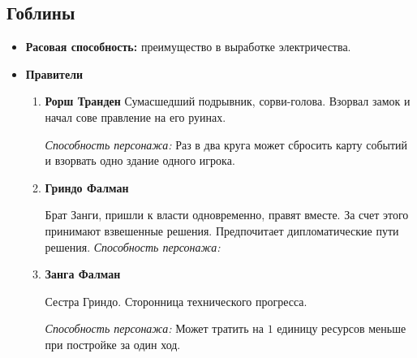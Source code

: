 \documentclass[a4paper,12pt,landscape]{article}
\begin{document}
    \subsection{Гоблины}
    \begin{itemize}
      \item \textbf{Расовая способность:} преимущество в выработке электричества.
      \item \textbf{Правители}
        \begin{enumerate} 
          \item \textbf{Рорш Транден}
          Сумасшедший подрывник, сорви-голова. Взорвал замок и начал сове правление на его руинах.

          \textit{Способность персонажа:} Раз в два круга может сбросить карту событий и взорвать одно здание одного игрока.
          
          \item \textbf{Гриндо Фалман}
          
          Брат Занги, пришли к власти одновременно, правят вместе. За счет этого принимают взвешенные решения. Предпочитает дипломатические пути решения.
          \textit{Способность персонажа:} 
          
          \item \textbf{Занга Фалман}
          
          Сестра Гриндо. Сторонница технического прогресса.

          \textit{Способность персонажа:} Может тратить на $1$ единицу ресурсов меньше при постройке за один ход.
        \end{enumerate}
    \end{itemize}
    
\end{document}
